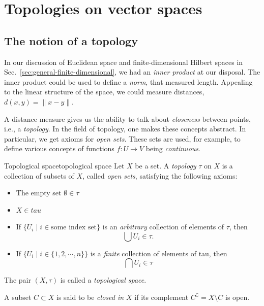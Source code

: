 \chapter{Topologies on vector spaces}
\label{chapter:topology}


\section{The notion of a topology}
\label{sec:topological-vector-spaces}


In our discussion of Euclidean space and finite-dimensional Hilbert spaces in Sec.~\ref{sec:general-finite-dimensional}, we had an \emph{inner product} at our disposal. The inner product could be used to define a \emph{norm}, that measured length. Appealing to the linear structure of the space, we could measure distances, $d(x,y) = \|x - y\|$.

A distance measure gives us the ability to talk about \emph{closeness} between points, i.e., a \emph{topology}. In the field of topology, one makes these concepts abstract. In particular, we get axioms for \emph{open sets}. These sets are used, for example, to define various concepts of functions $f : U\to V$ being \emph{continuous}.

\begin{myDefinition}{Topological space}{topological space}
Let $X$ be a set.
A \emph{topology} $\tau$ on $X$ is a collection  of subsets of $X$, called \emph{open sets},  satisfying the following axioms:
\begin{itemize}
    \item The empty set $\emptyset \in \tau$ 
    \item $X \in tau$ 
    \item If $\{U_i \mid i \in \text{some index set}\}$ is an \emph{arbitrary} collection of elements of $\tau$, then
    $$ \bigcup U_i \in \tau. $$
    \item If $\{U_i \mid i \in \{1,2,\cdots,n\}\}$ is a \emph{finite} collection of elements of tau, then 
    $$ \bigcap U_i \in \tau $$
\end{itemize}
The pair $(X,\tau)$ is called a \emph{topological space}.

A subset $C\subset X$ is said to be \emph{closed in $X$} if its complement $C^\complement = X \setminus C$ is open.
\end{myDefinition}



